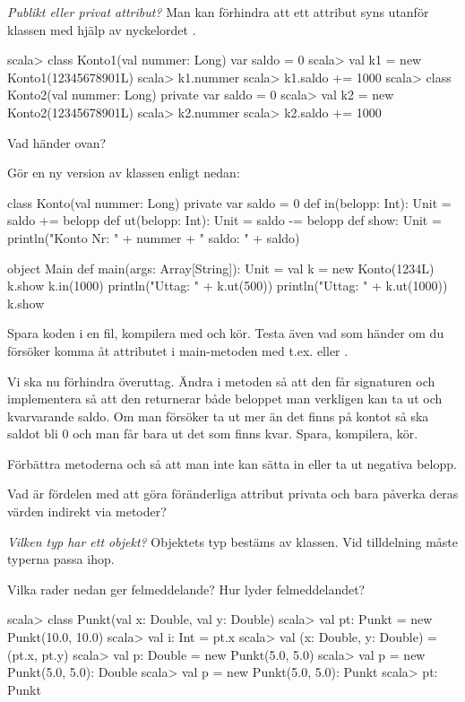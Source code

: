 \Task \emph{Publikt eller privat attribut?} Man kan förhindra att ett attribut syns utanför klassen med hjälp av nyckelordet .  

\begin{REPL}
scala> class Konto1(val nummer: Long){ var saldo = 0 }
scala> val k1 = new Konto1(12345678901L)
scala> k1.nummer
scala> k1.saldo += 1000
scala> class Konto2(val nummer: Long){ private var saldo = 0 }
scala> val k2 = new Konto2(12345678901L)
scala> k2.nummer
scala> k2.saldo += 1000
\end{REPL}

\Subtask Vad händer ovan?

\Subtask Gör en ny version av klassen  enligt nedan:

\begin{Code}
class Konto(val nummer: Long){ 
  private var saldo = 0
  def in(belopp: Int): Unit = {saldo += belopp}
  def ut(belopp: Int): Unit = {saldo -= belopp}
  def show: Unit = 
    println("Konto Nr: " + nummer + " saldo: " + saldo) 
}

object Main {
  def main(args: Array[String]): Unit = {
    val k = new Konto(1234L)
    k.show
    k.in(1000)
    println("Uttag: " + k.ut(500))
    println("Uttag: " + k.ut(1000))
    k.show
  }
}
\end{Code}

\Subtask Spara koden i en fil, kompilera med  och kör. Testa även vad som händer om du försöker komma åt attributet  i main-metoden med t.ex.  eller . 

\Subtask Vi ska nu förhindra överuttag. Ändra i metoden  så att den får signaturen  och implementera  så att den returnerar både beloppet man verkligen kan ta ut och kvarvarande saldo. Om man försöker ta ut mer än det finns på kontot så ska saldot bli 0 och man får bara ut det som finns kvar. Spara, kompilera, kör. 

\Subtask Förbättra metoderna  och  så att man inte kan sätta in eller ta ut negativa belopp.

\Subtask Vad är fördelen med att göra föränderliga attribut privata och bara påverka deras värden indirekt via metoder?

\Task \emph{Vilken typ har ett objekt?} Objektets typ bestäms av klassen. Vid tilldelning måste typerna passa ihop.

\Subtask Vilka rader nedan ger felmeddelande? Hur lyder felmeddelandet?
\begin{REPL}
scala> class Punkt(val x: Double, val y: Double)
scala> val pt: Punkt = new Punkt(10.0, 10.0)
scala> val i: Int = pt.x
scala> val (x: Double, y: Double) = (pt.x, pt.y)
scala> val p: Double = new Punkt(5.0, 5.0)
scala> val p = new Punkt(5.0, 5.0): Double
scala> val p = new Punkt(5.0, 5.0): Punkt
scala> pt: Punkt
\end{REPL}


